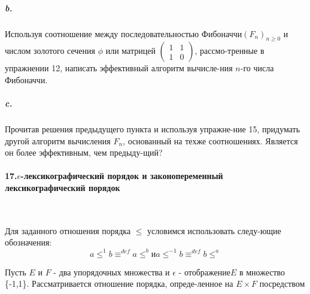 \newpage
\subparagraph { b.} Используя соотношение между последовательностью Фибоначчи\linebreak ${\left({F_n}\right)}_{n\geq{0}}$ и числом золотого сечения $\phi$ или матрицей $\begin{pmatrix}1 & 1 \\ 1 & 0 \end{pmatrix}$, рассмо-\linebreak тренные в упражнении 12, написать эффективный алгоритм вычисле-\linebreak ния $n$-го числа Фибоначчи.

\subparagraph { c.} Прочитав решения предыдущего пункта и используя упражне-\linebreak ние 15, придумать другой алгоритм вычисления $F_{n}$, основанный на тех\linebreak же соотношениях. Является он более эффективным, чем предыду-\linebreak щий? 

\paragraph { 17.$\epsilon$-лексикографический порядок и законопеременный лексикографический порядок}\ \newline

Для заданного отношения порядка $\leq$ условимся использовать следу-\linebreak ющие обозначения:
\begin{equation*}
a\leq^{1}b \equiv^{def} a\leq^{b}  \text{и}   a\leq^{-1}b \equiv^{def} b\leq^{a}
\end{equation*}

Пусть $E$ и $F$ - два упорядочных множества и $\epsilon$ - отображение\linebreak $E$ в множество      
\{-1,1\}. Рассматривается отношение порядка, опреде-\linebreak ленное на $E\times{F}$ посредством 

